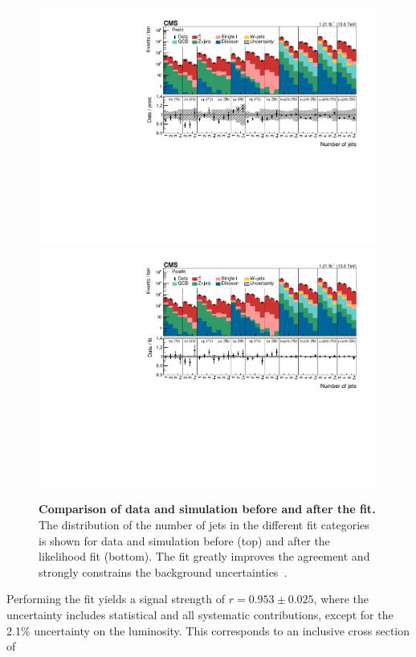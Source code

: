 \begin{figure}[!ht]
\centering
\includegraphics[width=0.99\textwidth]{figures/ttxs/prefithist.pdf}
\includegraphics[width=0.99\textwidth]{figures/ttxs/postfithist.pdf}

\caption{
   \textbf{Comparison of data and simulation before and after the fit.} The distribution of the number of jets in the different fit categories is shown for data and simulation before (top) and after the likelihood fit (bottom). The fit greatly improves the agreement and strongly constrains the background uncertainties~\cite{CMS:TOP-22-012}.
}
\label{fig:ttxs:prepostfit}
\end{figure}

Performing the fit yields a \ttbar signal strength of $r = 0.953 \pm 0.025$, where the uncertainty includes statistical and all systematic contributions, except for the 2.1\% uncertainty on the luminosity. This corresponds to an inclusive \ttbar cross section of

